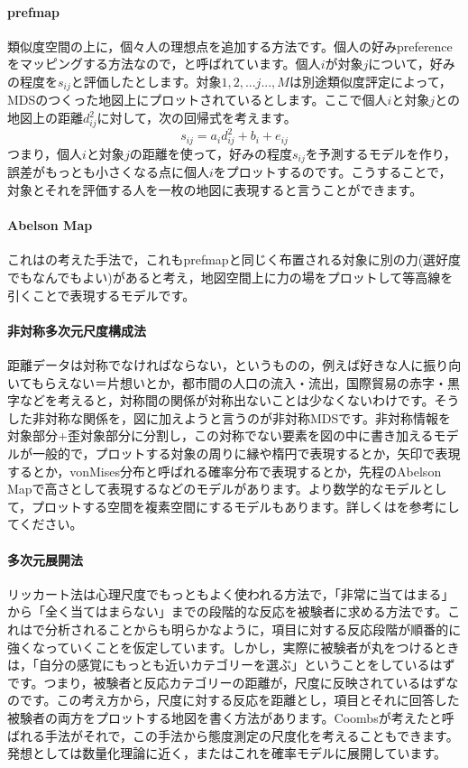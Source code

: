 \documentclass{ltjsbook}
\begin{document}
\paragraph{prefmap}類似度空間の上に，個々人の理想点を追加する方法です。個人の好みpreferenceをマッピングする方法なので，と呼ばれています。個人$i$が対象$j$について，好みの程度を$s_{ij}$と評価したとします。対象$1,2,...j...,M$は別途類似度評定によって，MDSのつくった地図上にプロットされているとします。ここで個人$i$と対象$j$との地図上の距離$d_{ij}^2$に対して，次の回帰式を考えます。
\[ s_{ij} = a_i d_{ij}^2 + b_i + e_{ij} \]
つまり，個人$i$と対象$j$の距離を使って，好みの程度$s_{ij}$を予測するモデルを作り，誤差がもっとも小さくなる点に個人$i$をプロットするのです。こうすることで，対象とそれを評価する人を一枚の地図に表現すると言うことができます。

\paragraph{Abelson Map}これは\citep{abelson1954technique}の考えた手法で，これもprefmapと同じく布置される対象に別の力(選好度でもなんでもよい)があると考え，地図空間上に力の場をプロットして等高線を引くことで表現するモデルです。

\paragraph{非対称多次元尺度構成法}距離データは対称でなければならない，というものの，例えば好きな人に振り向いてもらえない＝片想いとか，都市間の人口の流入・流出，国際貿易の赤字・黒字などを考えると，対称間の関係が対称出ないことは少なくないわけです。そうした非対称な関係を，図に加えようと言うのが非対称MDSです。非対称情報を対象部分+歪対象部分に分割し，この対称でない要素を図の中に書き加えるモデルが一般的で，プロットする対象の周りに縁や楕円で表現するとか，矢印で表現するとか，vonMises分布と呼ばれる確率分布で表現するとか，先程のAbelson Mapで高さとして表現するなどのモデルがあります。より数学的なモデルとして，プロットする空間を複素空間にするモデルもあります。詳しくは\citet{千野直仁2012-04}を参考にしてください。

\paragraph{多次元展開法}リッカート法は心理尺度でもっともよく使われる方法で，「非常に当てはまる」から「全く当てはまらない」までの段階的な反応を被験者に求める方法です。これはで分析されることからも明らかなように，項目に対する反応段階が順番的に強くなっていくことを仮定しています。しかし，実際に被験者が丸をつけるときは，「自分の感覚にもっとも近いカテゴリーを選ぶ」ということをしているはずです。つまり，被験者と反応カテゴリーの距離が，尺度に反映されているはずなのです。この考え方から，尺度に対する反応を距離とし，項目とそれに回答した被験者の両方をプロットする地図を書く方法があります。Coombsが考えたと呼ばれる手法がそれで，この手法から態度測定の尺度化を考えることもできます。発想としては数量化理論に近く，また\citet{shimizu2018}はこれを確率モデルに展開しています。
\end{document}
